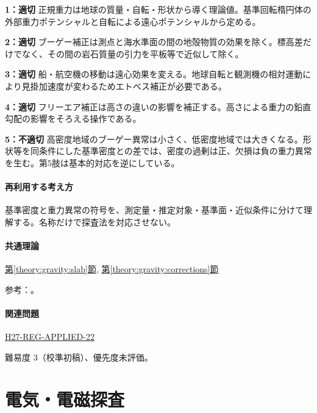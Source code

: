 \noindent\textbf{1：適切} 正規重力は地球の質量・自転・形状から導く理論値。基準回転楕円体の外部重力ポテンシャルと自転による遠心ポテンシャルから定める。\par

\noindent\textbf{2：適切} ブーゲー補正は測点と海水準面の間の地殻物質の効果を除く。標高差だけでなく、その間の岩石質量の引力を平板等で近似して除く。\par

\noindent\textbf{3：適切} 船・航空機の移動は遠心効果を変える。地球自転と観測機の相対運動により見掛加速度が変わるためエトベス補正が必要である。\par

\noindent\textbf{4：適切} フリーエア補正は高さの違いの影響を補正する。高さによる重力の鉛直勾配の影響をそろえる操作である。\par

\noindent\textbf{5：不適切} 高密度地域のブーゲー異常は小さく、低密度地域では大きくなる。形状等を同条件にした基準密度との差では、密度の過剰は正、欠損は負の重力異常を生む。第5肢は基本的対応を逆にしている。\par

\paragraph{再利用する考え方} 基準密度と重力異常の符号を、測定量・推定対象・基準面・近似条件に分けて理解する。名称だけで探査法を対応させない。

\paragraph{共通理論} \hyperref[theory:gravity:slab]{第\ref*{theory:gravity:slab}節}, \hyperref[theory:gravity:corrections]{第\ref*{theory:gravity:corrections}節}

\par 参考：\cite{gsi_gravity_definitions}。

\paragraph{関連問題} \hyperref[q:h27-reg-applied-22]{H27-REG-APPLIED-22}

\par 難易度 3（校準初稿）、優先度未評価。

\section{電気・電磁探査}

